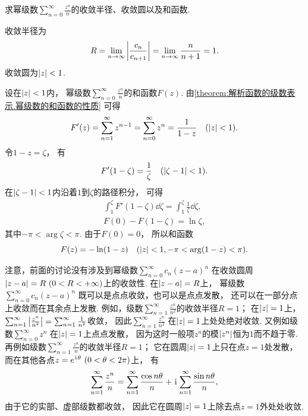 \begin{example}
求幂级数\(\sum_{n=0}^\infty \frac{z^n}{n}\)的收敛半径、收敛圆以及和函数.
\begin{solution}
收敛半径为\begin{equation*}
	R = \lim_{n\to\infty} \abs{\frac{c_n}{c_{n+1}}}
	= \lim_{n\to\infty} \frac{n}{n+1}
	= 1.
\end{equation*}
收敛圆为\(\abs{z} < 1\).

设在\(\abs{z} < 1\)内，
幂级数\(\sum_{n=0}^\infty \frac{z^n}{n}\)的和函数\(F(z)\).
由\cref{theorem:解析函数的级数表示.幂级数的和函数的性质} 可得\begin{equation*}
	F'(z) = \sum_{n=1}^\infty z^{n-1}
	= \sum_{n=0}^\infty z^n
	= \frac{1}{1-z}
	\quad(\abs{z} < 1).
\end{equation*}
令\(1-z = \zeta\)，
有\begin{equation*}
	F'(1-\zeta) = \frac{1}{\zeta}
	\quad(\abs{\zeta-1}<1).
\end{equation*}
在\(\abs{\zeta-1}<1\)内沿着\(1\)到\(\zeta\)的路径积分，
可得\begin{gather*}
	\int_1^{\zeta} F'(1-\zeta) \dd{\zeta}
	= \int_1^{\zeta} \frac{1}{\zeta} \dd{\zeta}, \\
	F(0) - F(1-\zeta)
	= \ln \zeta,
\end{gather*}
其中\(-\pi < \arg \zeta < \pi\).
由于\(F(0) = 0\)，
所以和函数\begin{equation*}
	F(z) = -\ln(1-z)
	\quad(\abs{z}<1, -\pi < \arg(1-z) < \pi).
\end{equation*}
\end{solution}
\end{example}
注意，前面的讨论没有涉及到幂级数\(\sum_{n=0}^\infty c_n (z-a)^n\)
在收敛圆周\(\abs{z-a}=R\ (0<R<+\infty)\)上的收敛性.
在\(\abs{z-a}=R\)上，
幂级数\(\sum_{n=0}^\infty c_n (z-a)^n\)
既可以是点点收敛，也可以是点点发散，
还可以在一部分点上收敛而在其余点上发散.
例如，级数\(\sum_{n=1}^\infty \frac{z^n}{n^2}\)的收敛半径\(R=1\)；
在\(\abs{z}=1\)上，
\(\sum_{n=1}^\infty \abs{\frac{z^n}{n^2}}
= \sum_{n=1}^\infty \frac{1}{n^2}\)收敛，
因此\(\sum_{n=1}^\infty \frac{z^n}{n^2}\)
在\(\abs{z}=1\)上处处绝对收敛.
又例如级数\(\sum_{n=0}^\infty z^n\)
在\(\abs{z}=1\)上点点发散，
因为这时一般项\(z^n\)的模\(\abs{z^n}\)恒为\(1\)而不趋于零.
再例如级数\(\sum_{n=1}^\infty \frac{z^n}{n}\)的收敛半径\(R=1\)；
它在圆周\(\abs{z}=1\)上只在点\(z=1\)处发散，
而在其他各点\(z = e^{\iu\theta}\ (0<\theta<2\pi)\)上，
有\begin{equation*}
	\sum_{n=1}^\infty \frac{z^n}{n}
	= \sum_{n=1}^\infty \frac{\cos n\theta}{n}
	+ \kern1pt\mathrm{i}\kern1pt\sum_{n=1}^\infty \frac{\sin n\theta}{n},
\end{equation*}
由于它的实部、虚部级数都收敛，
因此它在圆周\(\abs{z}=1\)上除去点\(z=1\)外处处收敛.

